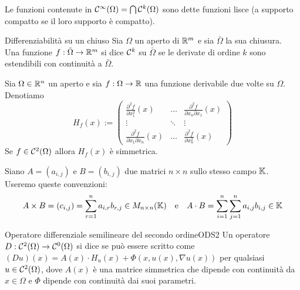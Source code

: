 \documentclass{article}
\begin{document}
\begin{definition}{}{}
    Le funzioni contenute in $\mathcal{C}^\infty(\Omega) = \bigcap \mathcal{C}^k(\Omega)$ sono dette funzioni lisce (a supporto compatto se il loro supporto è compatto). 
\end{definition}

\begin{definition}{Differenziabilità su un chiuso}{}
    Sia $\Omega$ un aperto di $\mathbb{R}^m$ e sia $\bar{\Omega}$ la sua chiusura.\\
    Una funzione $f:\bar{\Omega}\to\mathbb{R}^m$ si dice $\mathcal{C}^k$ su $\bar{\Omega}$ se le derivate di ordine $k$ sono estendibili con continuità a $\bar{\Omega}$.
\end{definition}

\begin{notation}
    Sia $\Omega \in \mathbb{R}^n$ un aperto e sia $f:\Omega \to \mathbb{R}$ una funzione derivabile due volte su $\Omega$. Denotiamo
    \[H_f(x):=\begin{pmatrix}
        \frac{\partial^2 f}{\partial x_1^2}(x) &\dots & \frac{\partial^2 f}{\partial x_n\partial x_1}(x)\\
        \vdots & \ddots & \vdots \\
        \frac{\partial^2 f}{\partial x_1\partial x_n}(x) &\dots & \frac{\partial^2 f}{\partial x_n^2}(x)
    \end{pmatrix}\]
    Se $f \in \mathcal{C}^2(\Omega)$ allora $H_f(x)$ è simmetrica.
\end{notation}

\begin{notation}
    Siano $A = (a_{i,j})$ e $B = (b_{i,j})$ due matrici $n\times n$ sullo stesso campo $\mathbb{K}$. Useremo queste convenzioni:
    \[A\times B = (c_{i,j}) = \sum_{r=1}^{n} a_{i,r} b_{r,j} \in M_{n\times n}(\mathbb{K}) \quad \text{e} \quad A\cdot B = \sum_{i = 1}^{n} \sum_{j=1}^{n} a_{i,j} b_{i,j} \in \mathbb{K}\]
\end{notation}


\begin{definition}{Operatore differenziale semilineare del secondo ordine}{ODS2}
    Un operatore $D:\mathcal{C}^2(\Omega) \to \mathcal{C}^0(\Omega)$ si dice  se può essere scritto come $(Du)(x) = A(x)\cdot H_u(x) + \Phi(x,u(x), \nabla u(x))$ per qualsiasi $u \in \mathcal{C}^2(\Omega)$, dove $A(x)$ è una matrice simmetrica che dipende con continuità da $x\in\Omega$ e $\Phi$ dipende con continuità dai suoi parametri.
\end{definition}
\end{document}
